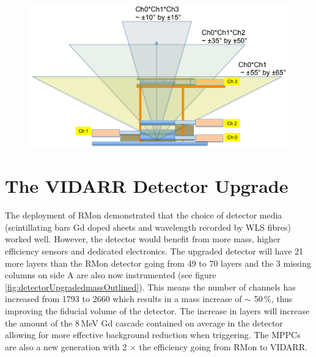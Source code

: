 \begin{figure}[!h]
 \centering
 \includegraphics[width=0.7\linewidth]{Chapter2/Figs/Raster/Prospect_MuonPaddels.png}
 \label{fig:Prospect_MuonPaddels}
\end{figure}

\clearpage
\section{The VIDARR Detector Upgrade}\label{sec:theUpgradedDetector}
The deployment of RMon demonstrated that the choice of detector media (scintillating bars Gd doped sheets and wavelength recorded by WLS fibres) worked well. However, the detector would benefit from more mass, higher efficiency sensors and dedicated electronics. The upgraded detector will have 21 more layers than the RMon detector going from 49 to 70 layers and the 3 missing columns on side A are also now instrumented (see figure \ref{fig:detectorUpgradedmassOutlined}). This means the number of channels has increased from 1793 to 2660 which results in a mass increase of $\sim$ 50\,\%, thus improving the fiducial volume of the detector. The increase in layers will increase the amount of the 8\,MeV Gd cascade contained on average in the detector allowing for more effective background reduction when triggering. The MPPCs are also a new generation with 2 $\times$ the efficiency going from RMon to VIDARR. %

